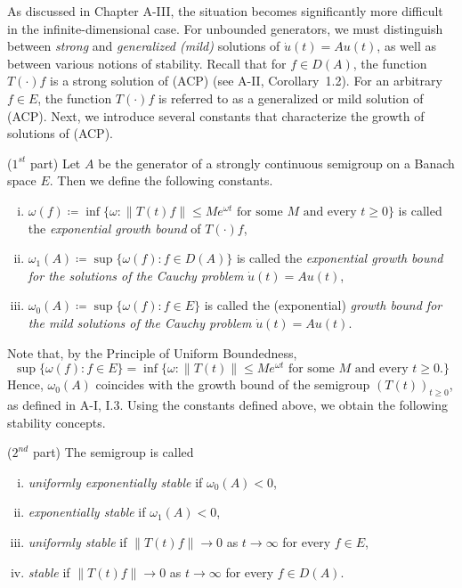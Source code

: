 As discussed in Chapter A-III, the situation becomes significantly more difficult in the infinite-dimensional case. 
For unbounded generators, we must distinguish between \emph{strong} and \emph{generalized (mild)} solutions of $\dot{u}(t) = Au(t)$, as well as between various notions of stability.
Recall that for $f \in D(A)$, the function $T(\cdot)f$ is a strong solution of (ACP) (see A-II, Corollary~1.2). 
For an arbitrary $f \in E$, the function $T(\cdot)f$ is referred to as a generalized or mild solution of (ACP). 
Next, we introduce several constants that characterize the growth of solutions of (ACP).
\begin{definition}($1^{st}$ part)\label{def:a4-1.1} 
Let $A$ be the generator of a strongly continuous semigroup on a Banach space $E$. 
Then we define the following constants.
\begin{enumerate}[(i))]
\item $\omega(f) \coloneqq \inf\{\omega \colon \|T(t)f\| \leq Me^{\omega t} \text{ for some } M \text{ and every } t \geq 0\}$ is called the \emph{exponential growth bound} of $T(\cdot)f$,
\item $\omega_{1}(A) \coloneqq \sup\{\omega(f) \colon f \in D(A)\}$ is called the \emph{exponential growth bound for the solutions of the Cauchy problem} $\dot{u}(t) = Au(t)$,
\item $\omega_0(A) \coloneqq \sup\{\omega(f) \colon f \in E\}$ is called the (exponential) \emph{growth bound for the mild solutions of the Cauchy problem} $\dot{u}(t) = Au(t)$.
\end{enumerate}
\end{definition}
Note that, by the Principle of Uniform Boundedness, 
\[
\sup\{\omega(f) \colon f \in E\} 
= \inf \{ \omega \colon \|T(t)\| \leq Me^{\omega t} 
    \text{ for some $M$ and every $t \geq 0 $.}\}
\]
Hence, $\omega_0(A)$ coincides with the growth bound of the semigroup $(T(t))_{t \geq 0}$, as defined in A-I, I.3. 
Using the constants defined above, we obtain the following stability concepts.
\setcounter{theorem}{0}
\begin{definition}($2^{nd}$ part)
The semigroup is called
\begin{enumerate}[(i), start=4]
\item
\emph{uniformly exponentially stable} if $\omega_0(A) < 0$,
\item 
\emph{exponentially stable} if $\omega_{1}(A) < 0$,
\item 
\emph{uniformly stable} if $\|T(t)f\| \to 0$ as $t \to \infty$ for every $f \in E$,
\item 
\emph{stable} if $\|T(t)f\| \to 0$ as $t \to \infty$ for every $f \in D(A)$.
\end{enumerate}
\end{definition}
